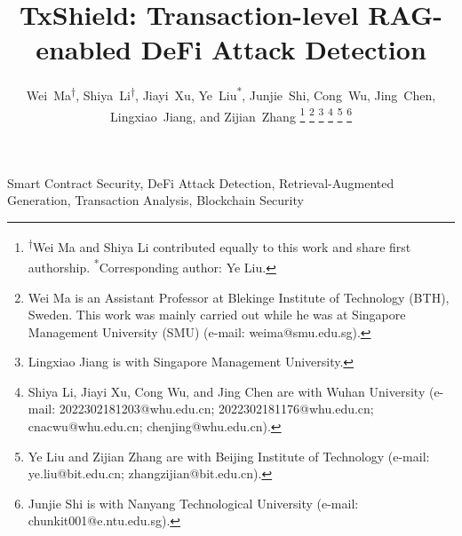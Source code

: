 \documentclass[journal,10pt]{IEEEtran}
\begin{document}
\title{TxShield: Transaction-level RAG-enabled DeFi Attack Detection}
\author{Wei~Ma\textsuperscript{\ensuremath{\dagger}}, Shiya~Li\textsuperscript{\ensuremath{\dagger}}, Jiayi~Xu, Ye~Liu\textsuperscript{*}, Junjie~Shi, Cong~Wu, Jing~Chen, Lingxiao~Jiang, and Zijian~Zhang%
\thanks{\textsuperscript{\ensuremath{\dagger}}Wei Ma and Shiya Li contributed equally to this work and share first authorship. \textsuperscript{*}Corresponding author: Ye Liu.}%
\thanks{Wei Ma is an Assistant Professor at Blekinge Institute of Technology (BTH), Sweden. This work was mainly carried out while he was at Singapore Management University (SMU) (e-mail: weima@smu.edu.sg).}%
\thanks{Lingxiao Jiang is with Singapore Management University.}%
\thanks{Shiya Li, Jiayi Xu, Cong Wu, and Jing Chen are with Wuhan University (e-mail: 2022302181203@whu.edu.cn; 2022302181176@whu.edu.cn; cnacwu@whu.edu.cn; chenjing@whu.edu.cn).}%
\thanks{Ye Liu and Zijian Zhang are with Beijing Institute of Technology (e-mail: ye.liu@bit.edu.cn; zhangzijian@bit.edu.cn).}%
\thanks{Junjie Shi is with Nanyang Technological University (e-mail: chunkit001@e.ntu.edu.sg).}}
\maketitle

\begin{IEEEkeywords}
Smart Contract Security, DeFi Attack Detection, Retrieval-Augmented Generation, Transaction Analysis, Blockchain Security
\end{IEEEkeywords}











\end{document}
